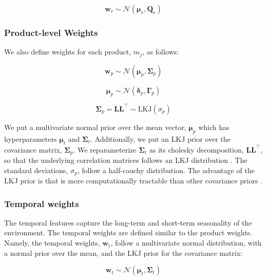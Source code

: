 \begin{equation}\label{simple-w-r}
    \textbf{w}_r \sim \mathcal{N}(\boldsymbol{\mu}_r, \textbf{Q}_r)
\end{equation}

\subsubsection{Product-level Weights}

We also define weights for each product, $m_j$, as follows:

\begin{equation}
    \textbf{w}_p \sim \mathcal{N}(\boldsymbol{\mu}_p, \boldsymbol{\Sigma}_p)
\end{equation}

\begin{equation}
    \boldsymbol{\mu}_p \sim \mathcal{N}(\boldsymbol{\delta}_p, \boldsymbol{\Gamma}_p)
\end{equation}

\begin{equation}
    \boldsymbol{\Sigma}_p = \textbf{L}\textbf{L}^{\top} \sim \text{LKJ}(\sigma_p)
\end{equation}


We put a multivariate normal prior over the mean vector, $\boldsymbol{\mu}_p$ which has hyperparameters $\boldsymbol{\mu}_t$ and $\boldsymbol{\Sigma}_t$. Additionally, we put an LKJ prior over the covariance matrix, $\boldsymbol{\Sigma}_p$. We reparameterize $\boldsymbol{\Sigma}_t$ as its cholesky decomposition, $\textbf{L}\textbf{L}^{\top}$, so that the underlying correlation matrices follows an LKJ distribution \cite{lewandowski}. The standard deviations, $\sigma_p$, follow a half-cauchy distribution. The advantage of the LKJ prior is that is more computationally tractable than other covariance priors \cite{lewandowski}.


\subsubsection{Temporal weights}
 The temporal features capture the long-term and short-term seasonality of the environment. The temporal weights are defined similar to the product weights. Namely, the temporal weights, $\textbf{w}_t$, follow a multivariate normal distribution, with a normal prior over the mean, and the LKJ prior for the covariance matrix:

\begin{equation}
    \textbf{w}_t \sim \mathcal{N}(\boldsymbol{\mu}_t, \boldsymbol{\Sigma}_t)
\end{equation}

